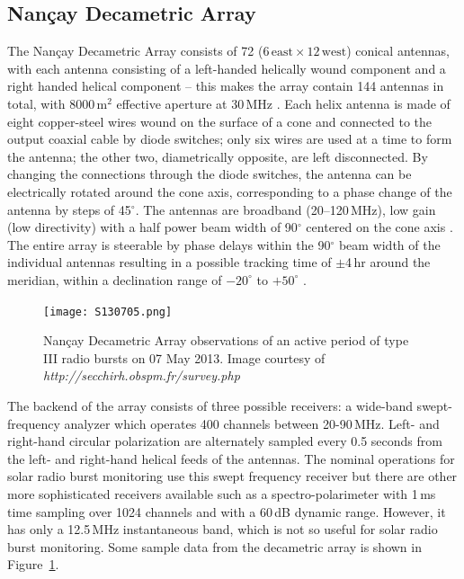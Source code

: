 


\subsection{Nan\c{c}ay Decametric Array}\label{sec:32}

The Nan\c{c}ay Decametric Array consists of 72 ($6\,\mathrm{east} \times12\,\mathrm{west}$) conical antennas, with each antenna consisting of a left-handed helically wound component and a right handed helical component -- this makes the array contain 144 antennas in total, with 8000\,m$^2$ effective aperture at 30\,MHz \citep{lecacheux2000}. Each helix antenna is made of eight copper-steel wires wound on the surface of a cone and connected to the output coaxial cable by diode switches; only six wires are used at a time to form the antenna; the other two, diametrically opposite, are left disconnected. By changing the connections through the diode switches, the antenna can be electrically rotated around the cone axis, corresponding to a phase change of the antenna by steps of 45$^{\circ}$. The antennas are broadband (20--120\,MHz), low gain (low directivity) with a half power beam width of 90$^{\circ}$ centered on the cone axis \citep{boischot1980}. The entire array is steerable by phase delays within the 90$^{\circ}$  beam width of the individual antennas resulting in a possible tracking time of $\pm$4\,hr around the meridian, within a declination range of $-20^{\circ}$ to $+50^{\circ}$ .
\begin{figure}[!t]
\begin{center}
\texttt{[image: S130705.png]}
\caption[Nan\c{c}ay Decametric Array observations]{Nan\c{c}ay Decametric Array observations of an active period of type III radio bursts on 07 May 2013. Image courtesy of {\it http://secchirh.obspm.fr/survey.php}}
\label{fig:nda_typeIIIs}
\end{center}
\end{figure}

The backend of the array consists of three possible receivers: a wide-band swept-frequency analyzer which operates 400 channels between 20-90\,MHz. Left- and right-hand circular polarization are alternately sampled every 0.5 seconds from the left- and right-hand helical feeds of the antennas. The nominal operations for solar radio burst monitoring use this swept frequency receiver but there are other more sophisticated receivers available such as a spectro-polarimeter with 1\,ms time sampling over 1024 channels and with a 60\,dB dynamic range. However, it has only a 12.5\,MHz instantaneous band, which is not so useful for solar radio burst monitoring. Some sample data from the decametric array is shown in Figure~\ref{fig:nda_typeIIIs}.


